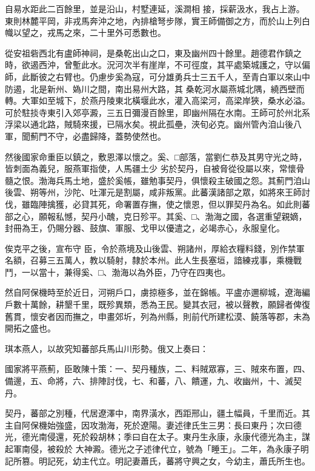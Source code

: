 \begin{pinyinscope}
 自易水距此二百餘里，並是沿山，村墅連延，溪澗相
 接，採薪汲水，我占上游。東則林麓平岡，非戎馬奔沖之地，內排槍弩步隊，實王師備御之方，而於山上列白幟以望之，戎馬之來，二十里外可悉數也。



 從安祖砦西北有盧師神祠，是桑乾出山之口，東及幽州四十餘里。趙德君作鎮之時，欲遏西沖，曾塹此水。況河次半有崖岸，不可徑度，其平處築城護之，守以偏師，此斷彼之右臂也。仍慮步奚為寇，可分雄勇兵士三五千人，至青白軍以來山中防遏，北是新州、媯川之間，南出易州大路，其
 桑乾河水屬燕城北隅，繞西壁而轉。大軍如至城下，於燕丹陵東北橫堰此水，灌入高梁河，高梁岸狹，桑水必溢。可於駐掞寺東引入郊亭澱，三五日彌漫百餘里，即幽州隔在水南。王師可於州北系浮梁以通北路，賊騎來援，已隔水矣。視此孤壘，浹旬必克。幽州管內洎山後八軍，聞薊門不守，必盡歸降，蓋勢使然也。



 然後國家命重臣以鎮之，敷恩澤以懷之。奚、□部落，當劉仁恭及其男守光之時，皆刺面為義兒，服燕軍指使，人馬疆土少
 劣於契丹，自被脅從役屬以來，常懷骨髓之恨。渤海兵馬土地，盛於奚帳，雖勉事契丹，俱懷殺主破國之怨。其薊門洎山後雲、朔等州，沙陀、吐渾元是割屬，咸非叛黨。此蕃漢諸部之眾，如將來王師討伐，雖臨陣擒獲，必貸其死，命署置存撫，使之懷恩，但以罪契丹為名。如此則蕃部之心，願報私憾，契丹小醜，克日殄平。其奚、□、渤海之國，各選重望親嫡，封冊為王，仍賜分器、鼓旗、軍服、戈甲以優遣之，必竭赤心，永服皇化。



 俟克平之後，宣布守
 臣，令於燕境及山後雲、朔諸州，厚給衣糧料錢，別作禁軍名額，召募三五萬人，教以騎射，隸於本州。此人生長塞垣，諳練戎事，乘機戰鬥，一以當十，兼得奚、□、渤海以為外臣，乃守在四夷也。



 然自阿保機時至於近日，河朔戶口，虜掠極多，並在錦帳。平盧亦邇柳城，遼海編戶數十萬餘，耕墾千里，既殄異類，悉為王民。變其衣冠，被以聲教，願歸者俾復舊貫，懷安者因而撫之，申畫郊圻，列為州縣，則前代所建松漠、饒落等郡，未為開拓之盛也。



 琪本燕人，以故究知蕃部兵馬山川形勢。俄又上奏曰：



 國家將平燕薊，臣敢陳十策：一、契丹種族，二、料賊眾寡，三、賊來布置，四、備邊，五、命將，六、排陣討伐，七、和蕃，八、饋運，九、收幽州，十、滅契丹。



 契丹，蕃部之別種，代居遼澤中，南界潢水，西距邢山，疆土幅員，千里而近。其主自阿保機始強盛，因攻渤海，死於遼陽。妻述律氏生三男：長曰東丹；次曰德光，德光南侵還，死於殺胡林；季曰自在太子。東丹生永康，永康代德光為主，謀起軍南侵，被殺於
 大神澱。德光之子述律代立，號為「睡王」。二年，為永康子明記所篡。明記死，幼主代立。明記妻蕭氏，蕃將守興之女，今幼主，蕭氏所生也。




\end{pinyinscope}
